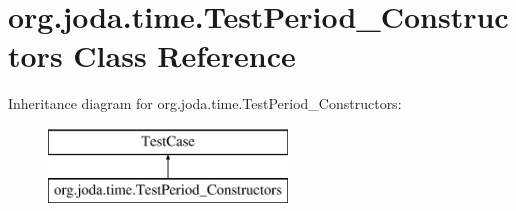 \hypertarget{classorg_1_1joda_1_1time_1_1_test_period___constructors}{\section{org.\-joda.\-time.\-Test\-Period\-\_\-\-Constructors Class Reference}
\label{classorg_1_1joda_1_1time_1_1_test_period___constructors}
}
Inheritance diagram for org.\-joda.\-time.\-Test\-Period\-\_\-\-Constructors\-:\begin{figure}[H]
\begin{center}
\leavevmode
\includegraphics[height=2.000000cm]{classorg_1_1joda_1_1time_1_1_test_period___constructors}
\end{center}
\end{figure}
